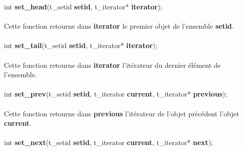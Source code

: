\documentclass[10pt,a4wide]{article}
\begin{document}
\hspace{1.5cm}int \textbf{set\_head}(t\_setid \textbf{setid},
                                     t\_iterator* \textbf{iterator});

\paragraph{}

Cette fonction retourne dans \textbf{iterator} le premier objet de
l'ensemble \textbf{setid}.

\paragraph{}

\hspace{1.5cm}int \textbf{set\_tail}(t\_setid \textbf{setid},
                                     t\_iterator* \textbf{iterator});

\paragraph{}

Cette fonction retourne dans \textbf{iterator} l'it\'erateur du dernier
\'el\'ement de l'ensemble.

\paragraph{}

\hspace{1.5cm}int \textbf{set\_prev}(t\_setid \textbf{setid},
                                     t\_iterator \textbf{current},
                                     t\_iterator* \textbf{previous});

\paragraph{}

Cette fonction retourne dans \textbf{previous} l'it\'erateur de l'objet
pr\'ec\'edent l'objet \textbf{current}.

\paragraph{}

\hspace{1.5cm}int \textbf{set\_next}(t\_setid \textbf{setid},
                                     t\_iterator \textbf{current},
                                     t\_iterator* \textbf{next});
\end{document}
